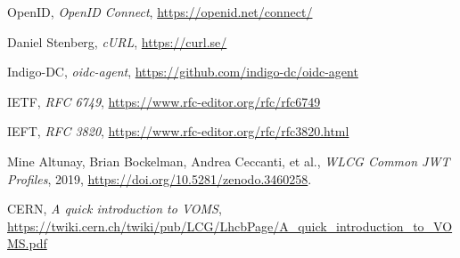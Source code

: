 \begin{thebibliography}{99}
	OpenID, 
	\textit{OpenID Connect},
	\url{https://openid.net/connect/}

	Daniel Stenberg, \textit{cURL}, 
	\url{https://curl.se/}

	Indigo-DC, \textit{oidc-agent}, 
	\url{https://github.com/indigo-dc/oidc-agent}

	IETF, 
	\textit{RFC 6749},
	\url{https://www.rfc-editor.org/rfc/rfc6749}

	IEFT,
	\textit{RFC 3820},
	\url{https://www.rfc-editor.org/rfc/rfc3820.html}

	Mine Altunay, Brian Bockelman, Andrea Ceccanti, et al., \textit{WLCG Common JWT Profiles}, 2019,
	\url{https://doi.org/10.5281/zenodo.3460258}.

	CERN, \textit{A quick introduction to VOMS},
	\url{https://twiki.cern.ch/twiki/pub/LCG/LhcbPage/A_quick_introduction_to_VOMS.pdf}

\end{thebibliography}